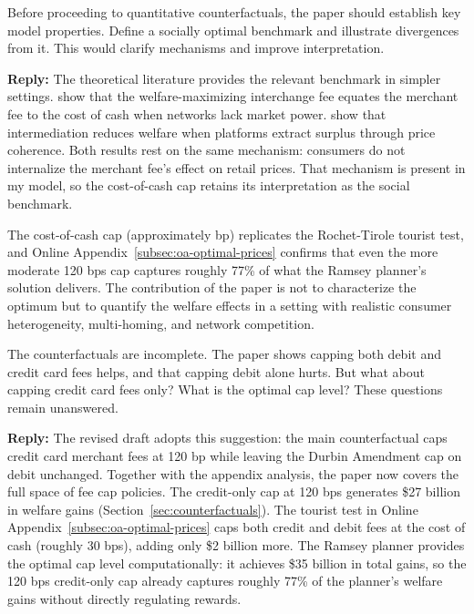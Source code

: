 \documentclass[main.tex]{subfiles}
\begin{document}
\begin{refsection}
\begin{refcommentnoclear}
Before proceeding to quantitative counterfactuals, the paper should establish key model properties.
Define a socially optimal benchmark and illustrate divergences from it.
This would clarify mechanisms and improve interpretation.

\end{refcommentnoclear}

\textbf{Reply:} The theoretical literature provides the relevant benchmark in simpler settings.
\textcite{Rochet.Tirole2011} show that the welfare-maximizing interchange fee equates the merchant fee to the cost of cash when networks lack market power. \textcite{Edelman.Wright2015} show that intermediation reduces welfare when platforms extract surplus through price coherence.
Both results rest on the same mechanism: consumers do not internalize the merchant fee's effect on retail prices.
That mechanism is present in my model, so the cost-of-cash cap retains its interpretation as the social benchmark.

The cost-of-cash cap (approximately  bp) replicates the Rochet-Tirole tourist test, and Online Appendix~\ref{subsec:oa-optimal-prices} confirms that even the more moderate 120 bps cap captures roughly 77\% of what the Ramsey planner's solution delivers.
The contribution of the paper is not to characterize the optimum but to quantify the welfare effects in a setting with realistic consumer heterogeneity, multi-homing, and network competition.

\begin{refcommentnoclear}
The counterfactuals are incomplete.
The paper shows capping both debit and credit card fees helps, and that capping debit alone hurts.
But what about capping credit card fees only?
What is the optimal cap level?
These questions remain unanswered.
\end{refcommentnoclear}

\textbf{Reply:} The revised draft adopts this suggestion: the main counterfactual caps credit card merchant fees at 120 bp while leaving the Durbin Amendment cap on debit unchanged.
Together with the appendix analysis, the paper now covers the full space of fee cap policies.
The credit-only cap at 120 bps generates \$27 billion in welfare gains (Section~\ref{sec:counterfactuals}).
The tourist test in Online Appendix~\ref{subsec:oa-optimal-prices} caps both credit and debit fees at the cost of cash (roughly 30 bps), adding only \$2 billion more.
The Ramsey planner provides the optimal cap level computationally: it achieves \$35 billion in total gains, so the 120 bps credit-only cap already captures roughly 77\% of the planner's welfare gains without directly regulating rewards.


\end{refsection}
\end{document}
